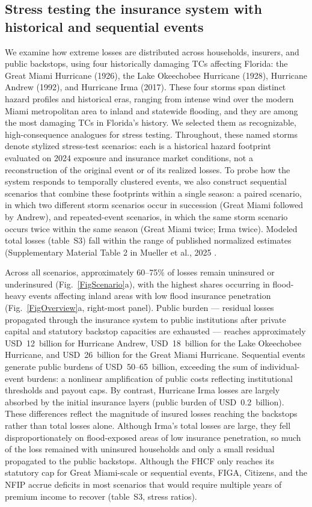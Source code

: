 \documentclass[fleqn,10pt]{wlscirep}
\newcommand{\SITabIII}{table~S3}
\begin{document}
\subsection*{Stress testing the insurance system with historical and sequential events}
We examine how extreme losses are distributed across households, insurers, and public backstops, using four historically damaging TCs affecting Florida: the Great Miami Hurricane (1926), the Lake Okeechobee Hurricane (1928), Hurricane Andrew (1992), and Hurricane Irma (2017). These four storms span distinct hazard profiles and historical eras, ranging from intense wind over the modern Miami metropolitan area to inland and statewide flooding, and they are among the most damaging TCs in Florida's history. We selected them as recognizable, high-consequence analogues for stress testing. Throughout, these named storms denote stylized stress-test scenarios: each is a historical hazard footprint evaluated on 2024 exposure and insurance market conditions, not a reconstruction of the original event or of its realized losses. To probe how the system responds to temporally clustered events, we also construct sequential scenarios that combine these footprints within a single season: a paired scenario, in which two different storm scenarios occur in succession (Great Miami followed by Andrew), and repeated-event scenarios, in which the same storm scenario occurs twice within the same season (Great Miami twice; Irma twice). Modeled total losses (\SITabIII) fall within the range of published normalized estimates (Supplementary Material Table 2 in Mueller et al., 2025 \cite{muller_normalized_2025}.\medskip

Across all scenarios, approximately 60--75\% of losses remain uninsured or underinsured (Fig.~\ref{FigScenario}a), with the highest shares occurring in flood-heavy events affecting inland areas with low flood insurance penetration (Fig.~\ref{FigOverview}a, right-most panel). Public burden --- residual losses propagated through the insurance system to public institutions after private capital and statutory backstop capacities are exhausted --- reaches approximately USD~12~billion for Hurricane Andrew, USD~18~billion for the Lake Okeechobee Hurricane, and USD~26~billion for the Great Miami Hurricane. Sequential events generate public burdens of USD~50--65~billion, exceeding the sum of individual-event burdens: a nonlinear amplification of public costs reflecting institutional thresholds and payout caps. By contrast, Hurricane Irma losses are largely absorbed by the initial insurance layers (public burden of USD~0.2~billion). These differences reflect the magnitude of insured losses reaching the backstops rather than total losses alone. Although Irma's total losses are large, they fell disproportionately on flood-exposed areas of low insurance penetration, so much of the loss remained with uninsured households and only a small residual propagated to the public backstops. Although the FHCF only reaches its statutory cap for Great Miami-scale or sequential events, FIGA, Citizens, and the NFIP accrue deficits in most scenarios that would require multiple years of premium income to recover (\SITabIII, stress ratios). \medskip\medskip
\end{document}
